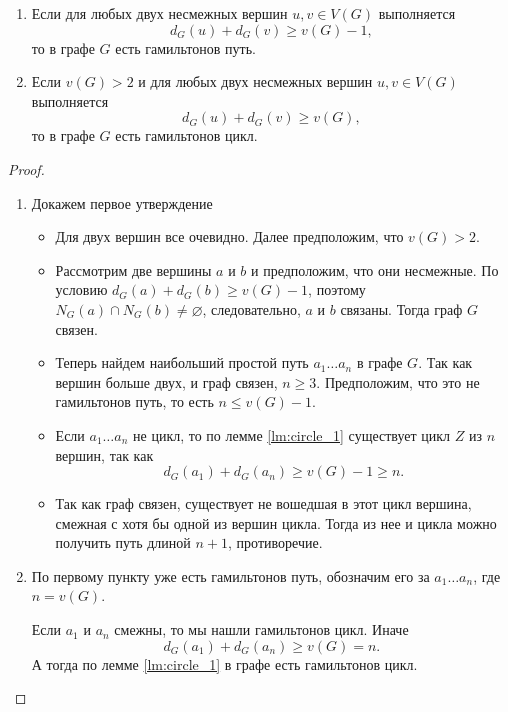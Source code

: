 \begin{theorem}
	\begin{enumerate}
		\item Если для любых двух несмежных вершин $u, v \in V(G)$ выполняется 
			\[
			d_G(u) + d_{G}(v) \ge v(G) - 1
			,\] 
			то в графе $G$ есть гамильтонов путь.
		\item Если  $v(G) > 2$ и для любых двух несмежных вершин  $u, v \in V(G)$ выполняется
			\[
			d_{G}(u) + d_{G}(v) \ge v(G)
			,\] 
			то в графе $G$ есть гамильтонов цикл.
	\end{enumerate}
\end{theorem}
\begin{proof}
\begin{enumerate}
	\item Докажем первое утверждение
	\begin{itemize}
	\item Для двух вершин все очевидно. Далее предположим, что  $v(G) > 2$.
	\item Рассмотрим две вершины $a$ и $b$ и  предположим, что они несмежные. По условию $d_G(a)+ d_{G}(b) \ge v(G) -1 $, поэтому $N_G(a) \cap N_G(b) \neq \varnothing$, следовательно, $a$ и $b$ связаны. Тогда граф $G$ связен.
	\item Теперь найдем наибольший простой путь $a_1\ldots a_{n}$ в графе $G$. Так как вершин больше двух, и граф связен, $n \ge 3$. Предположим, что это не гамильтонов путь, то есть $n \le v(G) - 1$.
	\item Если $a_1\ldots a_{n}$ не цикл, то по лемме \ref{lm:circle_1} существует цикл $Z$ из $n$ вершин, так как 
		\[
		d_G(a_1) + d_G(a_{n}) \ge v(G) - 1 \ge n
		.\] 
	\item Так как граф связен, существует не вошедшая в этот цикл вершина, смежная с хотя бы одной из вершин цикла. Тогда из нее и цикла можно получить путь длиной $n+1$, противоречие.
	\end{itemize}
\item По первому пункту уже есть гамильтонов путь, обозначим его за $a_1\ldots a_{n}$, где $n = v(G)$.

	Если $a_1$ и $a_n$ смежны, то мы нашли гамильтонов цикл. Иначе
	\[
	d_G(a_1) + d_G(a_{n}) \ge v(G) = n
	.\] 
	А тогда по лемме \ref{lm:circle_1} в графе есть гамильтонов цикл.
\end{enumerate}    
\end{proof}
